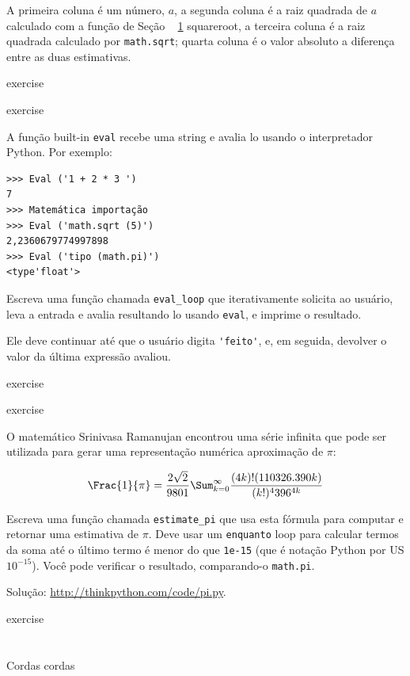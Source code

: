 \documentclass[10pt]{book}
\begin{document}
\begin{exercise}
{\begin{}
\begin{verbatim}
\end{verbatim}
%
A primeira coluna é um número, $ a $, a segunda coluna é
a raiz quadrada de $ a $ calculado com a função de
Seção ~ \ref {} squareroot, a terceira coluna é a raiz quadrada calculado
por {\tt math.sqrt}; quarta coluna é o valor absoluto
a diferença entre as duas estimativas.
\end{} exercise


\begin{} exercise

A função built-in {\tt eval} recebe uma string e avalia
lo usando o interpretador Python. Por exemplo:

\begin{verbatim}
>>> Eval ('1 + 2 * 3 ')
7
>>> Matemática importação
>>> Eval ('math.sqrt (5)')
2,2360679774997898
>>> Eval ('tipo (math.pi)')
<type'float'>
\end{verbatim}
%
Escreva uma função chamada \verb "eval_loop" que iterativamente
solicita ao usuário, leva a entrada e avalia resultando
lo usando {\tt eval}, e imprime o resultado.

Ele deve continuar até que o usuário digita \verb "'feito'", e, em seguida,
devolver o valor da última expressão avaliou.

\end{} exercise


\begin{} exercise

O matemático Srinivasa Ramanujan encontrou uma
série infinita
que pode ser utilizada para gerar uma representação numérica
aproximação de $ \pi $:

\[\Frac {1} {\pi} = \frac {2 \sqrt {2}} {9801} 
\Sum ^ \infty_ {k = 0} \frac {(4k)! (1103 26.390 k)} {(k!) ^ 4 396 ^ {4k}} \]

Escreva uma função chamada \verb "estimate_pi" que usa esta fórmula
para computar e retornar uma estimativa de $ \pi $. Deve usar um {\tt enquanto}
loop para calcular termos da soma até o último termo é
menor do que {\tt 1e-15} (que é notação Python por US $ 10 ^ {-15} $).
Você pode verificar o resultado, comparando-o {\tt math.pi}.

Solução: \url{http://thinkpython.com/code/pi.py}.

\end{} exercise


\chapter{} Cordas
\label{} cordas


}
\end{exercise}
\end{document}
